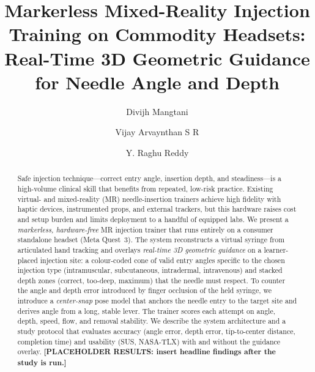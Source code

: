 \documentclass[sigconf]{acmart}
\begin{document}
\title{Markerless Mixed-Reality Injection Training on Commodity Headsets:
Real-Time 3D Geometric Guidance for Needle Angle and Depth}

\author{Divijh Mangtani}

\author{Vijay Arvaynthan S R}
\authornotemark[1]
\correspondingauthor
{}

\author{Y. Raghu Reddy}

\renewcommand{\shortauthors}{Mangtani et al.}

\begin{abstract}
Safe injection technique---correct entry angle, insertion depth, and steadiness---is a
high-volume clinical skill that benefits from repeated, low-risk practice. Existing virtual- and
mixed-reality (MR) needle-insertion trainers achieve high fidelity with haptic devices,
instrumented props, and external trackers, but this hardware raises cost and setup burden and
limits deployment to a handful of equipped labs. We present a \emph{markerless, hardware-free}
MR injection trainer that runs entirely on a consumer standalone headset (Meta Quest~3). The
system reconstructs a virtual syringe from articulated hand tracking and overlays \emph{real-time
3D geometric guidance} on a learner-placed injection site: a colour-coded cone of valid entry
angles specific to the chosen injection type (intramuscular, subcutaneous, intradermal,
intravenous) and stacked depth zones (correct, too-deep, maximum) that the needle must respect.
To counter the angle and depth error introduced by finger occlusion of the held syringe, we
introduce a \emph{center-snap} pose model that anchors the needle entry to the target site and
derives angle from a long, stable lever. The trainer scores each attempt on angle, depth, speed,
flow, and removal stability. We describe the system architecture and a study protocol that
evaluates accuracy (angle error, depth error, tip-to-center distance, completion time) and
usability (SUS, NASA-TLX) with and without the guidance overlay.
\textbf{[PLACEHOLDER RESULTS: insert headline findings after the study is run.]}
\end{abstract}
\end{document}
